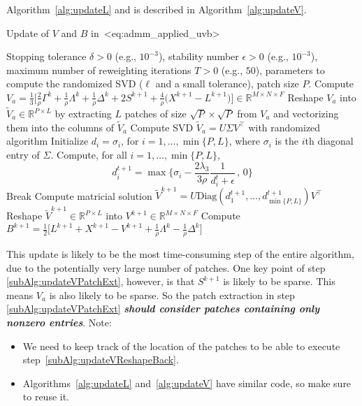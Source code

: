 \documentclass[a4paper,11pt]{article}
\def\eqref#1{<#1>}%
\begin{document}
Algorithm~\ref{alg:updateL} and is described in Algorithm~\ref{alg:updateV}.
\begin{algorithm}
  \caption{Update of $V$ and $B$ in~\eqref{eq:admm_applied_uvb}}
  \label{alg:updateV}
  \begin{algorithmic}[1]
  \algrenewcommand{}
  \Require Stopping tolerance $\delta > 0$ (e.g., $10^{-3}$), stability number $\epsilon > 0$ (e.g., $10^{-3}$), maximum number of
  reweighting iterations $T > 0$ (e.g., $50$), parameters to compute the
  randomized SVD ($\ell$ and a small tolerance), patch size $P$.
  \State Compute 
  $ V_a = 
  \frac{1}{3}\Big[\frac{2}{\rho}\Gamma^k + \frac{1}{\rho}\Lambda^k +
    \frac{1}{\rho}\Delta^k  + 2S^{k+1}
  + \frac{4}{\rho}\big(X^{k+1} - L^{k+1}\big)\Big] \in \mathbb{R}^{M\times N\times F}$
  \State Reshape $V_a$ into $\widetilde{V}_a \in \mathbb{R}^{P \times L}$ by
  extracting $L$ patches of size $\sqrt{P} \times \sqrt{P}$ from $V_a$ and vectorizing
  them into the columns of $\widetilde{V}_a$
  \label{subAlg:updateVPatchExt}
  \State Compute SVD $\widetilde{V}_a = U \Sigma V^\top$ with randomized
  algorithm
  \State Initialize $d_i = \sigma_i$, for $i = 1, \ldots, \min\{P, L\}$, where
  $\sigma_i$ is the $i$th diagonal entry of $\Sigma$.
    \State Compute, for all $i = 1, \ldots, \min\{P, L\}$, 
    $$
    d_i^{t+1} = \max\Big\{\sigma_i - \frac{2\lambda_3}{3 \rho}\frac{1}{d_i^t + \epsilon}\, ,\, 0\Big\}
    $$
      \State Break
    \EndIf
  \EndFor
  \State Compute matricial solution $\widetilde{V}^{k+1} = U
  \text{Diag}(d_1^{t+1}, \ldots, d_{\min\{P, L\}}^{t+1}) V^\top$
  \State Reshape $\widetilde{V}^{k+1} \in \mathbb{R}^{P \times L}$ into
  $V^{k+1} \in \mathbb{R}^{M\times N\times F}$
  \label{subAlg:updateVReshapeBack}
  \State Compute 
  $B^{k+1} = \frac{1}{2}\Big[L^{k+1} + X^{k+1} - V^{k+1} +\frac{1}{\rho}\Lambda^k - \frac{1}{\rho}\Delta^k\Big]$
  \end{algorithmic}
\end{algorithm}

This update is likely to be the most time-consuming step of the entire
algorithm, due to the potentially very large number of patches. One key point
of step \ref{subAlg:updateVPatchExt},
however, is that $S^{k+1}$ is likely to be sparse. This means $V_a$ is also
likely to be sparse. So the patch extraction in step
\ref{subAlg:updateVPatchExt} \textbf{\textit{should consider patches containing only nonzero
entries}}. Note:
\begin{itemize}
  \item We need to keep track of the location of the patches to be able to
    execute step~\ref{subAlg:updateVReshapeBack}.

  \item Algorithms~\ref{alg:updateL} and~\ref{alg:updateV} have similar code,
    so make sure to reuse it.
\end{itemize}
\end{document}
